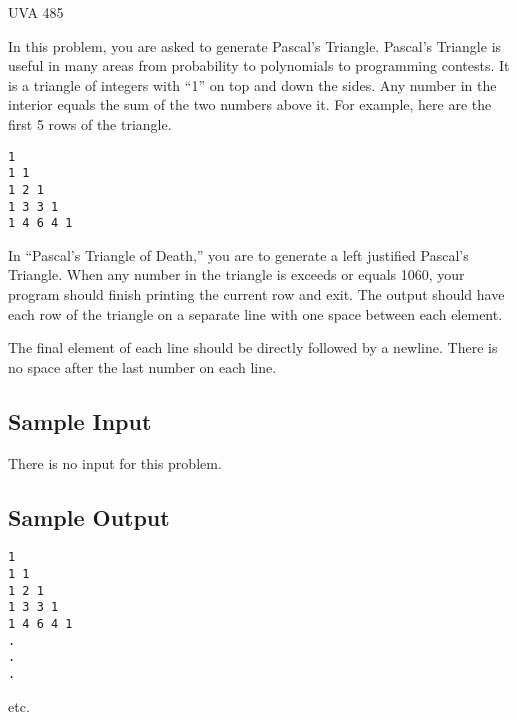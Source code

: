 

\noindent
UVA 485\bigskip

In this problem, you are asked to generate Pascal's Triangle. Pascal's Triangle is useful in many
areas from probability to polynomials to programming contests. It is a triangle of integers with
``1'' on top and down the sides. Any number in the interior equals the sum of the two numbers
above it. For example, here are the first 5 rows of the triangle.

\begin{verbatim}
1  
1 1  
1 2 1  
1 3 3 1  
1 4 6 4 1
\end{verbatim}

In ``Pascal's Triangle of Death,'' you are to generate a left justified Pascal's Triangle. When any
number in the triangle is exceeds or equals 1060, your program should finish printing the
current row and exit. The output should have each row of the triangle on a separate line with one
space between each element.

The final element of each line should be directly followed by a
newline. There is no space after the last number on each line.

\subsection*{Sample Input}

There is no input for this problem.

\subsection*{Sample Output}

\begin{verbatim}
1
1 1
1 2 1
1 3 3 1
1 4 6 4 1
.
.
.
\end{verbatim}

etc.
